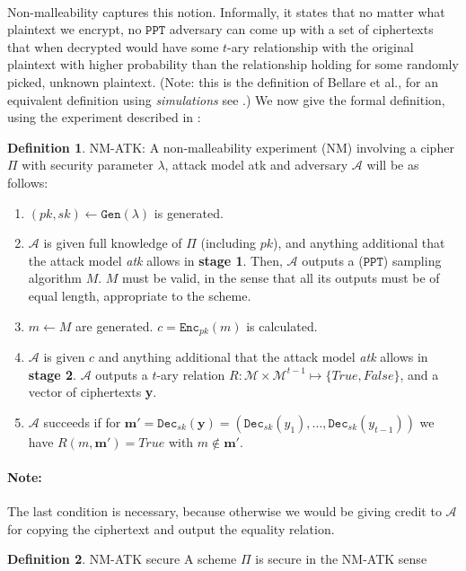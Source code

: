 \documentclass{article}
\theoremstyle{definition}
\newtheorem{definition}{Definition}[section]
\newcommand{\Enc}{\texttt{Enc}}
\newcommand{\Dec}{\texttt{Dec}}
\newcommand{\Gen}{\texttt{Gen}}
\newcommand{\M}{\mathcal{M}}
\newcommand{\A}{\mathcal{A}}
\newcommand{\PPT}{\texttt{PPT}}
\begin{document}
\paragraph{} Non-malleability captures this notion. Informally, it states that
no matter what plaintext we encrypt, no $\PPT$ adversary can come up with a set
of ciphertexts that when decrypted would have some $t$-ary relationship with the
original plaintext with higher probability than the relationship holding for
some randomly picked, unknown plaintext. (Note: this is the definition of Bellare et al., for an
equivalent definition using \textit{simulations} see
\cite{dolev2003nonmalleable}.) We now give the formal definition, using the
experiment described in \cite{bellaresecurityrelations}:
\begin{definition}{NM-ATK:}
  A non-malleability experiment (NM) involving a cipher $\Pi$ with security
  parameter $\lambda$, attack model atk and adversary $\A$ will be as follows:
  \begin{enumerate}
    \item $(pk, sk) \leftarrow \Gen(\lambda)$ is generated.
    \item $\A$ is given full knowledge of $\Pi$ (including $pk$), and anything additional that
      the attack model \textit{atk} allows in \textbf{stage 1}. Then, $\A$
      outputs a ($\PPT$) sampling algorithm $M$. $M$ must be valid, in the sense
      that all its outputs must be of equal length, appropriate to the scheme.
    \item $m \leftarrow M$ are generated. $c = \Enc_{pk}(m)$ is calculated.
    \item $\A$ is given $c$ and anything additional that the attack model
      \textit{atk} allows in \textbf{stage 2}. $\A$ outputs a $t$-ary relation
      $R:\M \times \M^{t-1} \mapsto \{True, False\}$, and a vector of
      ciphertexts \textbf{y}.
    \item $\A$ succeeds if for $\textbf{m}' = \Dec_{sk}(\textbf{y}) = (\Dec_{sk}(y_1),
      \hdots,\Dec_{sk}(y_{t-1}))$ we have $R(m, \textbf{m}') = True$ with $m
      \not\in \textbf{m}'$.
  \end{enumerate}
  \paragraph{Note:} The last condition is necessary, because otherwise we would
  be giving credit to $\A$ for copying the ciphertext and output the equality relation.
\end{definition}
\begin{definition}{NM-ATK secure}
 A scheme $\Pi$ is secure in the NM-ATK sense
\end{definition}
\end{document}
